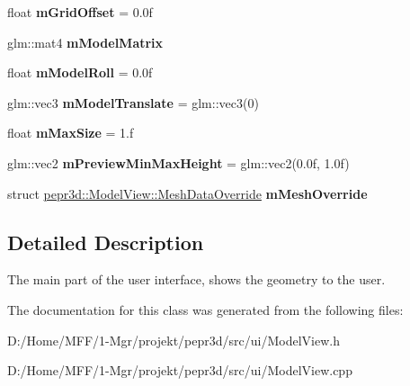 \begin{DoxyCompactItemize}
\item 
\mbox{\label{classpepr3d_1_1_model_view_aaad7b91e2a946b38bd930d108d07111e}} 
float {\bfseries m\+Grid\+Offset} = 0.\+0f
\item 
\mbox{\label{classpepr3d_1_1_model_view_a9fd29e6f6da7b236ee720c831d2d761a}} 
glm\+::mat4 {\bfseries m\+Model\+Matrix}
\item 
\mbox{\label{classpepr3d_1_1_model_view_ab76d51db2a07baaffd576603b68ce123}} 
float {\bfseries m\+Model\+Roll} = 0.\+0f
\item 
\mbox{\label{classpepr3d_1_1_model_view_a2435a4fd900c17ab27bbe82f58864614}} 
glm\+::vec3 {\bfseries m\+Model\+Translate} = glm\+::vec3(0)
\item 
\mbox{\label{classpepr3d_1_1_model_view_adf575a92a3398753c447f0f15e4ad79f}} 
float {\bfseries m\+Max\+Size} = 1.f
\item 
\mbox{\label{classpepr3d_1_1_model_view_af8a8ca2c09bf45ce02d87ae32e08c1cc}} 
glm\+::vec2 {\bfseries m\+Preview\+Min\+Max\+Height} = glm\+::vec2(0.\+0f, 1.\+0f)
\item 
\mbox{\label{classpepr3d_1_1_model_view_a8ba7c53c4f4a93938bb3a4f46a9d3dea}} 
struct \mbox{\hyperlink{structpepr3d_1_1_model_view_1_1_mesh_data_override}{pepr3d\+::\+Model\+View\+::\+Mesh\+Data\+Override}} {\bfseries m\+Mesh\+Override}
\end{DoxyCompactItemize}


\subsection{Detailed Description}
The main part of the user interface, shows the geometry to the user. 

The documentation for this class was generated from the following files\+:\begin{DoxyCompactItemize}
\item 
D\+:/\+Home/\+M\+F\+F/1-\/\+Mgr/projekt/pepr3d/src/ui/Model\+View.\+h\item 
D\+:/\+Home/\+M\+F\+F/1-\/\+Mgr/projekt/pepr3d/src/ui/Model\+View.\+cpp\end{DoxyCompactItemize}

